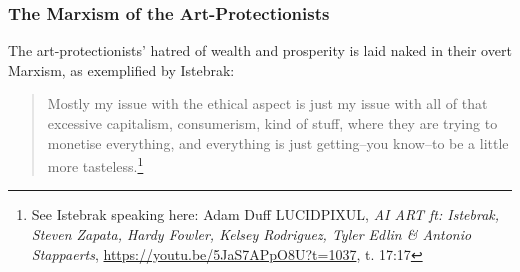 \documentclass[11pt]{article}
\begin{document}
\subsubsection*{The Marxism of the Art-Protectionists}
\label{sec:orgf8b74b7}
The art-protectionists' hatred of wealth and prosperity is laid naked in their overt Marxism, as exemplified by Istebrak:
\begin{quote}
Mostly my issue with the ethical aspect is just my issue with all of that excessive capitalism, consumerism, kind of stuff, where they are trying to monetise everything, and everything is just getting--you know--to be a little more tasteless.\footnote{See Istebrak speaking here: Adam Duff LUCIDPIXUL, \emph{AI ART ft: Istebrak, Steven Zapata, Hardy Fowler, Kelsey Rodriguez, Tyler Edlin \& Antonio Stappaerts}, \url{https://youtu.be/5JaS7APpO8U?t=1037}, t. 17:17}
\end{quote}
\end{document}
